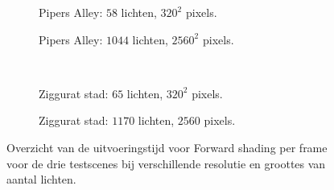 \begin{figure}[t]
\begin{adjustbox}{minipage=\textwidth, scale=0.55}
\begin{subfigure}[b]{0.8\textwidth}
      \caption{Pipers Alley: $58$ lichten, $320^2$ pixels.}
      \label{fig:ts-frames-forward:alley-low}
    \end{subfigure}
  \end{adjustbox}\hspace{-0.075\textwidth} %
  \begin{adjustbox}{minipage=\textwidth, scale=0.55}
    \begin{subfigure}[b]{0.8\textwidth}
      \centering
      \def\svgwidth{\textwidth}
      
      \caption{Pipers Alley: $1044$ lichten, $2560^2$ pixels.}
      \label{fig:ts-frames-forward:alley-high}
    \end{subfigure}
  \end{adjustbox} \\
  \begin{adjustbox}{minipage=\textwidth, scale=0.55}
    \begin{subfigure}[b]{0.8\textwidth}
      \centering
      \def\svgwidth{\textwidth}
      
      \caption{Ziggurat stad: $65$ lichten, $320^2$ pixels.}
      \label{fig:ts-frames-forward:city-low}
    \end{subfigure}
  \end{adjustbox}\hspace{-0.075\textwidth} %
  \begin{adjustbox}{minipage=\textwidth, scale=0.55}
    \begin{subfigure}[b]{0.8\textwidth}
      \centering
      \def\svgwidth{\textwidth}
      
      \caption{Ziggurat stad: $1170$ lichten, $2560$ pixels.}
      \label{fig:ts-frames-forward:city-high}
    \end{subfigure}
  \end{adjustbox}
  \caption{Overzicht van de uitvoeringstijd voor Forward shading per frame voor de
           drie testscenes bij verschillende resolutie en groottes van aantal
           lichten.}
  \label{fig:ts-frames-forward}
\end{figure}

